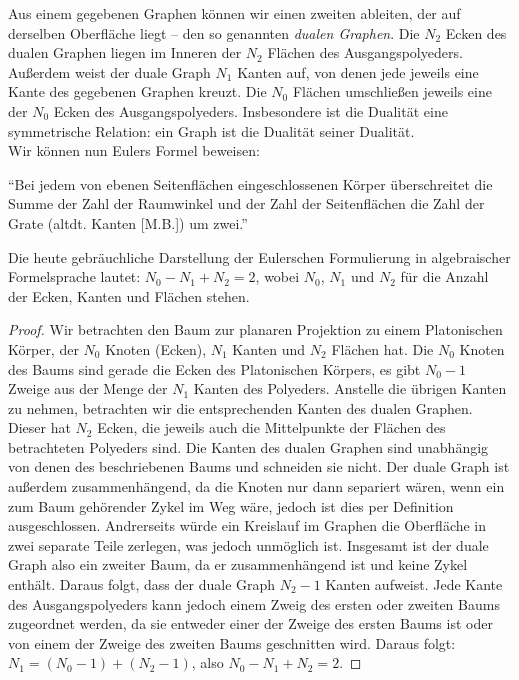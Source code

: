 Aus einem gegebenen Graphen können wir einen zweiten ableiten, der auf derselben Oberfläche liegt -- den so genannten \textit{dualen Graphen}.
Die $N_2$ Ecken des dualen Graphen liegen im Inneren der $N_2$ Flächen des Ausgangspolyeders. Außerdem weist der duale Graph $N_1$ Kanten auf, von denen jede jeweils eine Kante des gegebenen Graphen kreuzt. Die $N_0$ Flächen umschließen jeweils eine der $N_0$ Ecken des Ausgangspolyeders. Insbesondere ist die Dualität eine symmetrische Relation: ein Graph ist die Dualität seiner Dualität.\\
Wir können nun Eulers Formel beweisen:
\begin{theorem}
    \enquote{Bei jedem von ebenen Seitenflächen eingeschlossenen Körper überschreitet die Summe der Zahl der Raumwinkel und der Zahl der Seitenflächen die Zahl der Grate (altdt. Kanten [M.B.]) um zwei.}
\end{theorem}
Die heute gebräuchliche Darstellung der Eulerschen Formulierung in algebraischer Formelsprache lautet:
$N_0 - N_1 + N_2 =2 $, wobei $N_0$, $N_1$ und $N_2$ für die Anzahl der Ecken, Kanten und Flächen stehen.
\begin{proof}
Wir betrachten den Baum zur planaren Projektion zu einem Platonischen Körper, der $N_0$ Knoten (Ecken), $N_1$ Kanten und $N_2$ Flächen hat. Die $N_0$ Knoten des Baums sind gerade die Ecken des Platonischen Körpers, es gibt $N_0 -1$ Zweige aus der Menge der $N_1$ Kanten des Polyeders. Anstelle die übrigen Kanten zu nehmen, betrachten wir die entsprechenden Kanten des dualen Graphen. Dieser hat $N_2$ Ecken, die jeweils auch die Mittelpunkte der Flächen des betrachteten Polyeders sind. Die Kanten des dualen Graphen sind unabhängig von denen des beschriebenen Baums und schneiden sie nicht. Der duale Graph ist außerdem zusammenhängend, da die Knoten nur dann separiert wären, wenn ein zum Baum gehörender Zykel im Weg wäre, jedoch ist dies per Definition ausgeschlossen. Andrerseits würde ein Kreislauf im Graphen die Oberfläche in zwei separate Teile zerlegen, was jedoch unmöglich ist. Insgesamt ist der duale Graph also ein zweiter Baum, da er zusammenhängend ist und keine Zykel enthält. Daraus folgt, dass der duale Graph $N_2-1$ Kanten aufweist. Jede Kante des Ausgangspolyeders kann jedoch einem Zweig des ersten oder zweiten Baums zugeordnet werden, da sie entweder einer der Zweige des ersten Baums ist oder von einem der Zweige des zweiten Baums geschnitten wird. Daraus folgt: $N_1 = (N_0-1) + (N_2-1)$, also $N_0 - N_1 + N_2 =2 $.
\end{proof}
